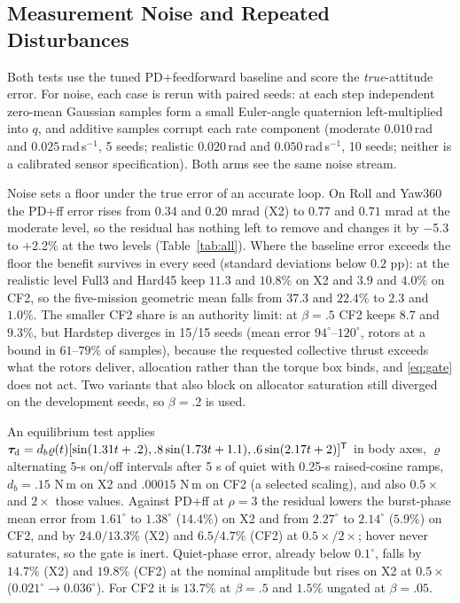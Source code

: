 \documentclass[letterpaper, 10 pt, conference]{ieeeconf}
\newcommand{\T}{^{\mathsf T}}
\begin{document}
\subsection{Measurement Noise and Repeated Disturbances}
\label{sec:noise}
Both tests use the tuned PD+feedforward baseline and score the \emph{true}-attitude error. For noise, each case is rerun with paired seeds: at each step independent zero-mean Gaussian samples form a small Euler-angle quaternion left-multiplied into $q$, and additive samples corrupt each rate component (moderate $0.010$\,rad and $0.025$\,rad\,s$^{-1}$, 5 seeds; realistic $0.020$\,rad and $0.050$\,rad\,s$^{-1}$, 10 seeds; neither is a calibrated sensor specification). Both arms see the same noise stream.

Noise sets a floor under the true error of an accurate loop. On Roll and Yaw360 the PD+ff error rises from $0.34$ and $0.20$ mrad (X2) to $0.77$ and $0.71$ mrad at the moderate level, so the residual has nothing left to remove and changes it by $-$5.3 to $+$2.2\% at the two levels (Table~\ref{tab:all}). Where the baseline error exceeds the floor the benefit survives in every seed (standard deviations below $0.2$ pp): at the realistic level Full3 and Hard45 keep $11.3$ and $10.8\%$ on X2 and $3.9$ and $4.0\%$ on CF2, so the five-mission geometric mean falls from $37.3$ and $22.4\%$ to $2.3$ and $1.0\%$. The smaller CF2 share is an authority limit: at $\beta=.5$ CF2 keeps $8.7$ and $9.3\%$, but Hardstep diverges in 15/15 seeds (mean error $94^\circ$--$120^\circ$, rotors at a bound in $61$--$79\%$ of samples), because the requested collective thrust exceeds what the rotors deliver, allocation rather than the torque box binds, and \eqref{eq:gate} does not act. Two variants that also block on allocator saturation still diverged on the development seeds, so $\beta=.2$ is used.

\label{sec:disturbance}
An equilibrium test applies $\bm\tau_{\rm d}=d_b\varrho(t)[\sin(1.31t+.2),\allowbreak .8\sin(1.73t+1.1),\allowbreak.6\sin(2.17t+2)]\T$ in body axes, $\varrho$ alternating 5-s on/off intervals after 5 s of quiet with 0.25-s raised-cosine ramps, $d_b=.15$ N\,m on X2 and $.00015$ N\,m on CF2 (a selected scaling), and also $0.5\times$ and $2\times$ those values. Against PD+ff at $\rho=3$ the residual lowers the burst-phase mean error from $1.61^\circ$ to $1.38^\circ$ ($14.4\%$) on X2 and from $2.27^\circ$ to $2.14^\circ$ ($5.9\%$) on CF2, and by $24.0/13.3\%$ (X2) and $6.5/4.7\%$ (CF2) at $0.5\times/2\times$; hover never saturates, so the gate is inert. Quiet-phase error, already below $0.1^\circ$, falls by $14.7\%$ (X2) and $19.8\%$ (CF2) at the nominal amplitude but rises on X2 at $0.5\times$ ($0.021^\circ\to0.036^\circ$). For CF2 it is $13.7\%$ at $\beta=.5$ and $1.5\%$ ungated at $\beta=.05$.
\end{document}

